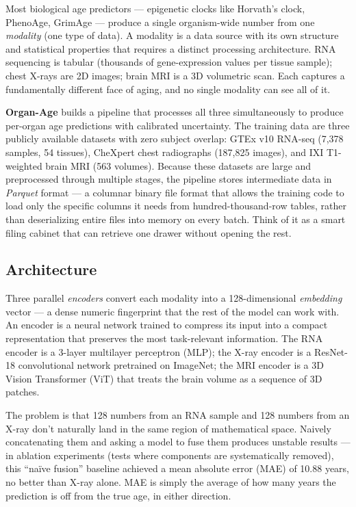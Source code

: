 \documentclass[11pt]{article}
\begin{document}
\begin{tcolorbox}[L2box]

Most biological age predictors --- epigenetic clocks like Horvath's clock, PhenoAge, GrimAge --- produce a single organism-wide number from one \textit{modality} (one type of data). A modality is a data source with its own structure and statistical properties that requires a distinct processing architecture. RNA sequencing is tabular (thousands of gene-expression values per tissue sample); chest X-rays are 2D images; brain MRI is a 3D volumetric scan. Each captures a fundamentally different face of aging, and no single modality can see all of it.

\textbf{Organ-Age} builds a pipeline that processes all three simultaneously to produce per-organ age predictions with calibrated uncertainty. The training data are three publicly available datasets with zero subject overlap: GTEx v10 RNA-seq (7,378 samples, 54 tissues), CheXpert chest radiographs (187,825 images), and IXI T1-weighted brain MRI (563 volumes). Because these datasets are large and preprocessed through multiple stages, the pipeline stores intermediate data in \textit{Parquet} format --- a columnar binary file format that allows the training code to load only the specific columns it needs from hundred-thousand-row tables, rather than deserializing entire files into memory on every batch. Think of it as a smart filing cabinet that can retrieve one drawer without opening the rest.

\subsection{Architecture}

Three parallel \textit{encoders} convert each modality into a 128-dimensional \textit{embedding} vector --- a dense numeric fingerprint that the rest of the model can work with. An encoder is a neural network trained to compress its input into a compact representation that preserves the most task-relevant information. The RNA encoder is a 3-layer multilayer perceptron (MLP); the X-ray encoder is a ResNet-18 convolutional network pretrained on ImageNet; the MRI encoder is a 3D Vision Transformer (ViT) that treats the brain volume as a sequence of 3D patches.

The problem is that 128 numbers from an RNA sample and 128 numbers from an X-ray don't naturally land in the same region of mathematical space. Naively concatenating them and asking a model to fuse them produces unstable results --- in ablation experiments (tests where components are systematically removed), this ``naïve fusion'' baseline achieved a mean absolute error (MAE) of 10.88 years, no better than X-ray alone. MAE is simply the average of how many years the prediction is off from the true age, in either direction.


\end{tcolorbox}
\end{document}
